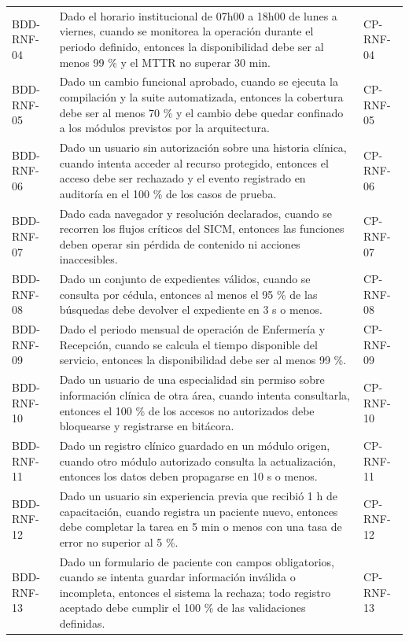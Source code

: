 \documentclass[11pt,a4paper]{article}
\begin{document}
\begin{appendices}
\begin{longtable}{p{2.8cm}p{10.6cm}p{2cm}}
		BDD-RNF-04 & Dado el horario institucional de 07h00 a 18h00 de lunes a viernes, cuando se monitorea la operación durante el periodo definido, entonces la disponibilidad debe ser al menos 99 \% y el MTTR no superar 30 min. & CP-RNF-04\\
		BDD-RNF-05 & Dado un cambio funcional aprobado, cuando se ejecuta la compilación y la suite automatizada, entonces la cobertura debe ser al menos 70 \% y el cambio debe quedar confinado a los módulos previstos por la arquitectura. & CP-RNF-05\\
		BDD-RNF-06 & Dado un usuario sin autorización sobre una historia clínica, cuando intenta acceder al recurso protegido, entonces el acceso debe ser rechazado y el evento registrado en auditoría en el 100 \% de los casos de prueba. & CP-RNF-06\\
		BDD-RNF-07 & Dado cada navegador y resolución declarados, cuando se recorren los flujos críticos del SICM, entonces las funciones deben operar sin pérdida de contenido ni acciones inaccesibles. & CP-RNF-07\\
		BDD-RNF-08 & Dado un conjunto de expedientes válidos, cuando se consulta por cédula, entonces al menos el 95 \% de las búsquedas debe devolver el expediente en 3 s o menos. & CP-RNF-08\\
		BDD-RNF-09 & Dado el periodo mensual de operación de Enfermería y Recepción, cuando se calcula el tiempo disponible del servicio, entonces la disponibilidad debe ser al menos 99 \%. & CP-RNF-09\\
		BDD-RNF-10 & Dado un usuario de una especialidad sin permiso sobre información clínica de otra área, cuando intenta consultarla, entonces el 100 \% de los accesos no autorizados debe bloquearse y registrarse en bitácora. & CP-RNF-10\\
		BDD-RNF-11 & Dado un registro clínico guardado en un módulo origen, cuando otro módulo autorizado consulta la actualización, entonces los datos deben propagarse en 10 s o menos. & CP-RNF-11\\
		BDD-RNF-12 & Dado un usuario sin experiencia previa que recibió 1 h de capacitación, cuando registra un paciente nuevo, entonces debe completar la tarea en 5 min o menos con una tasa de error no superior al 5 \%. & CP-RNF-12\\
		BDD-RNF-13 & Dado un formulario de paciente con campos obligatorios, cuando se intenta guardar información inválida o incompleta, entonces el sistema la rechaza; todo registro aceptado debe cumplir el 100 \% de las validaciones definidas. & CP-RNF-13\\

\end{longtable}
\end{appendices}
\end{document}
